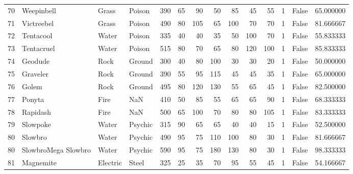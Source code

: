 \begin{tabular}{rlllrrrrrrrrlr}
  70 &                 Weepinbell &     Grass &    Poison &    390 &   65 &      90 &       50 &       85 &       45 &     55 &           1 &      False &   65.000000 \\
  71 &                 Victreebel &     Grass &    Poison &    490 &   80 &     105 &       65 &      100 &       70 &     70 &           1 &      False &   81.666667 \\
  72 &                  Tentacool &     Water &    Poison &    335 &   40 &      40 &       35 &       50 &      100 &     70 &           1 &      False &   55.833333 \\
  73 &                 Tentacruel &     Water &    Poison &    515 &   80 &      70 &       65 &       80 &      120 &    100 &           1 &      False &   85.833333 \\
  74 &                    Geodude &      Rock &    Ground &    300 &   40 &      80 &      100 &       30 &       30 &     20 &           1 &      False &   50.000000 \\
  75 &                   Graveler &      Rock &    Ground &    390 &   55 &      95 &      115 &       45 &       45 &     35 &           1 &      False &   65.000000 \\
  76 &                      Golem &      Rock &    Ground &    495 &   80 &     120 &      130 &       55 &       65 &     45 &           1 &      False &   82.500000 \\
  77 &                     Ponyta &      Fire &       NaN &    410 &   50 &      85 &       55 &       65 &       65 &     90 &           1 &      False &   68.333333 \\
  78 &                   Rapidash &      Fire &       NaN &    500 &   65 &     100 &       70 &       80 &       80 &    105 &           1 &      False &   83.333333 \\
  79 &                   Slowpoke &     Water &   Psychic &    315 &   90 &      65 &       65 &       40 &       40 &     15 &           1 &      False &   52.500000 \\
  80 &                    Slowbro &     Water &   Psychic &    490 &   95 &      75 &      110 &      100 &       80 &     30 &           1 &      False &   81.666667 \\
  80 &        SlowbroMega Slowbro &     Water &   Psychic &    590 &   95 &      75 &      180 &      130 &       80 &     30 &           1 &      False &   98.333333 \\
  81 &                  Magnemite &  Electric &     Steel &    325 &   25 &      35 &       70 &       95 &       55 &     45 &           1 &      False &   54.166667 \\

\end{tabular}
